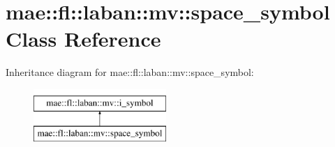\hypertarget{classmae_1_1fl_1_1laban_1_1mv_1_1space__symbol}{\section{mae\-:\-:fl\-:\-:laban\-:\-:mv\-:\-:space\-\_\-symbol Class Reference}
\label{classmae_1_1fl_1_1laban_1_1mv_1_1space__symbol}
}
Inheritance diagram for mae\-:\-:fl\-:\-:laban\-:\-:mv\-:\-:space\-\_\-symbol\-:\begin{figure}[H]
\begin{center}
\leavevmode
\includegraphics[height=2.000000cm]{classmae_1_1fl_1_1laban_1_1mv_1_1space__symbol}
\end{center}
\end{figure}
